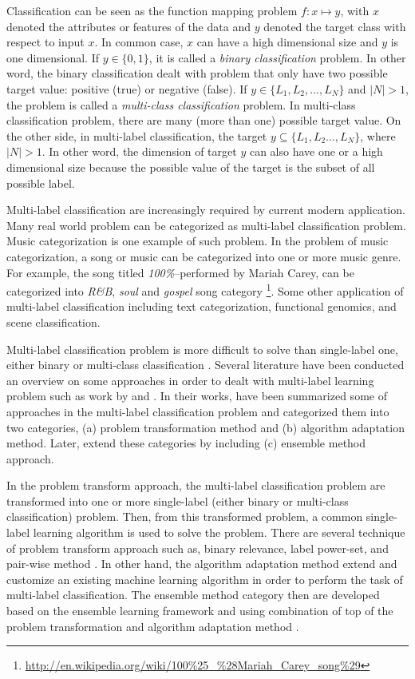 \documentclass{article}
\begin{document}
Classification can be seen as the function mapping problem $f\colon x \mapsto y$, with $x$ denoted the attributes or features of the data and $y$ denoted the target class with respect to input $x$. In common case, $x$ can have a high dimensional size and $y$ is one dimensional. If $y \in \{0,1\}$, it is called a \textit{binary classification} problem. In other word, the binary classification dealt with problem that only have two possible target value: positive (true) or negative (false). If $y \in \{L_1,L_2,\dots,L_N\}$ and $|N| > 1$, the problem is called a \textit{multi-class classification} problem. In multi-class classification problem, there are many (more than one) possible target value. On the other side, in multi-label classification, the target $y \subseteq \{L_1,L_2\dots,L_N\}$, where $|N| > 1$. In other word, the dimension of target $y$ can also have one or a high dimensional size because the possible value of the target is the subset of all possible label.

Multi-label classification are increasingly required by current modern application. Many real world problem can be categorized as multi-label classification problem. Music categorization is one example of such problem. In the problem of music categorization, a song or music can be categorized into one or more music genre. For example, the song titled \textit{100\%}--performed by Mariah Carey, can be categorized into \textit{R\&B}, \textit{soul} and \textit{gospel} song category \footnote{\url{http://en.wikipedia.org/wiki/100\%25\_\%28Mariah\_Carey\_song\%29}}. Some other application of multi-label classification including text categorization, functional genomics, and scene classification.

Multi-label classification problem is more difficult to solve than single-label one, either binary or multi-class classification \cite{Zhang2007}. Several literature have been conducted an overview on some approaches in order to dealt with multi-label learning problem such as work by \cite{Tsoumakas2007} and \cite{Madjarov2012}. In their works, \cite{Tsoumakas2007} have been summarized some of approaches in the multi-label classification problem and categorized them into two categories, (a) problem transformation method and (b) algorithm adaptation method. Later, \cite{Madjarov2012} extend these categories by including (c) ensemble method approach.

In the problem transform approach, the multi-label classification problem are transformed into one or more single-label (either binary or multi-class classification) problem. Then, from this transformed problem, a common single-label learning algorithm is used to solve the problem. There are several technique of problem transform approach such as, binary relevance, label power-set, and pair-wise method \cite{Madjarov2012}. In other hand, the algorithm adaptation method extend and customize an existing machine learning algorithm in order to perform the task of multi-label classification. The ensemble method category then are developed based on the ensemble learning framework and using combination of top of the problem transformation and algorithm adaptation method \cite{Madjarov2012}.
\end{document}
